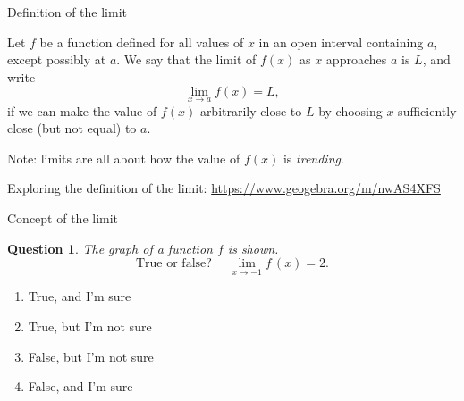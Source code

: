 \documentclass[11pt]{beamer}
\newtheorem{question}{Question}
\begin{document}


\begin{frame}{Definition of the limit}
\begin{definition}
Let $f$ be a function defined for all values of $x$ in an open interval containing $a$, except possibly at $a$. We say that the \alert{limit of $f(x)$ as $x$ approaches $a$ is $L$}, and write
\[
\lim_{x\to a}f(x) = L,
\]
if we can make the value of $f(x)$ arbitrarily close to $L$ by choosing $x$ sufficiently close (but not equal) to $a$.
\end{definition}

\alert{Note:} limits are all about how the value of $f(x)$ is \emph{trending}.

Exploring the definition of the limit: \href{https://www.geogebra.org/m/nwAS4XFS}{https://www.geogebra.org/m/nwAS4XFS}
\end{frame}
\begin{frame}{Concept of the limit}
\begin{question}
The graph of a function $f$ is shown.
\[
\text{True or false? } \quad \lim_{x\to -1}f\,(x)=2.
\]
\end{question}
\begin{multicols}{2}
\begin{enumerate}[label=\Alph*]
\item True, and I'm sure
\item True, but I'm not sure
\item False, but I'm not sure
\item False, and I'm sure
\end{enumerate}
\columnbreak
\begin{center}
\end{center}
\end{multicols}

\end{frame}
\end{document}
